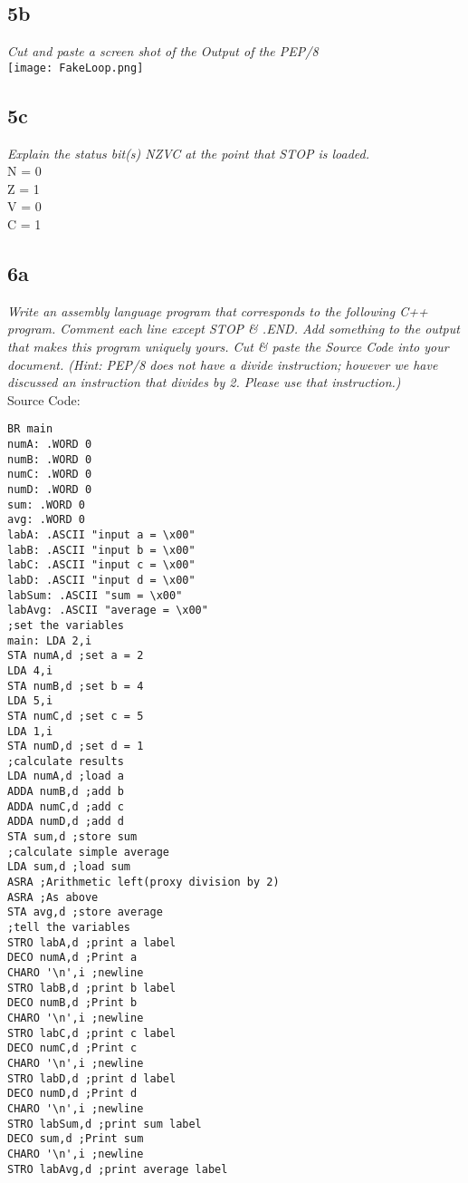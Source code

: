 \documentclass[a4paper,man,natbib]{apa6}
\begin{document}
{{{\subsection{5b}
\emph{Cut and paste a screen shot of the Output of the PEP/8} \\
\texttt{[image: FakeLoop.png]}
\subsection{5c}
\emph{Explain the status bit(s) NZVC at the point that STOP is loaded.} \\
N = 0 \\
Z = 1 \\
V = 0 \\
C = 1 \\
\subsection{6a}
\emph{Write an assembly language program that corresponds to the following C++ program. Comment each line except STOP \& .END. Add something to the output that makes this program uniquely yours. Cut \& paste the Source Code into your document. (Hint: PEP/8 does not have a divide instruction; however we have discussed an instruction that divides by 2. Please use that instruction.)} \\
Source Code:
{\renewcommand\fcolorbox[4][]{\textcolor{black}{\strut#4}}
	\begin{verbatim}
BR main
numA: .WORD 0
numB: .WORD 0
numC: .WORD 0
numD: .WORD 0
sum: .WORD 0
avg: .WORD 0
labA: .ASCII "input a = \x00"
labB: .ASCII "input b = \x00"
labC: .ASCII "input c = \x00"
labD: .ASCII "input d = \x00"
labSum: .ASCII "sum = \x00"
labAvg: .ASCII "average = \x00"
;set the variables
main: LDA 2,i
STA numA,d ;set a = 2
LDA 4,i
STA numB,d ;set b = 4
LDA 5,i
STA numC,d ;set c = 5
LDA 1,i
STA numD,d ;set d = 1
;calculate results
LDA numA,d ;load a
ADDA numB,d ;add b
ADDA numC,d ;add c
ADDA numD,d ;add d
STA sum,d ;store sum
;calculate simple average
LDA sum,d ;load sum
ASRA ;Arithmetic left(proxy division by 2)
ASRA ;As above
STA avg,d ;store average
;tell the variables
STRO labA,d ;print a label 
DECO numA,d ;Print a
CHARO '\n',i ;newline
STRO labB,d ;print b label 
DECO numB,d ;Print b
CHARO '\n',i ;newline
STRO labC,d ;print c label 
DECO numC,d ;Print c
CHARO '\n',i ;newline
STRO labD,d ;print d label 
DECO numD,d ;Print d
CHARO '\n',i ;newline
STRO labSum,d ;print sum label 
DECO sum,d ;Print sum
CHARO '\n',i ;newline
STRO labAvg,d ;print average label 

\end{verbatim}}}}}
\end{document}
